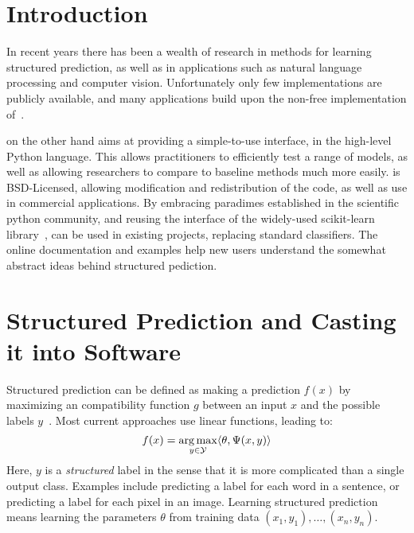 \section{Introduction}
In recent years there has been a wealth of research in methods for learning structured prediction,
as well as in applications such as natural language processing and computer vision.
Unfortunately only few implementations are publicly available, and many applications build upon
the non-free implementation of~\citet{joachims2009cutting}.

\pystruct on the other hand aims at providing a simple-to-use interface, in the high-level Python language.
This allows practitioners to efficiently test a range of models, as well as allowing researchers
to compare to baseline methods much more easily.
\pystruct is BSD-Licensed, allowing modification and redistribution of the code,
as well as use in commercial applications.  By embracing paradimes established
in the scientific python community, and reusing the interface of the
widely-used {\sc scikit-learn} library~\citep{pedregosa2011scikit}, \pystruct
can be used in existing projects, replacing standard classifiers.
The online documentation and examples help new
users understand the somewhat abstract ideas behind structured pediction.



\section{Structured Prediction and Casting it into Software}\label{sec:api}

Structured prediction can be defined as making a prediction $f(x)$ by maximizing an
compatibility function $g$ between an input $x$ and the possible labels
$y$~\cite{nowozin2011structured}. Most current approaches use linear functions,
leading to:
\begin{equation}\label{eq:main_equation}
    f(x) = \operatorname*{arg\,max}_{y \in \mathcal{Y}} \langle \theta, \Psi(x, y) \rangle 
\end{equation}
Here, $y$ is a \emph{structured} label in the sense that it is more complicated than a single
output class. Examples include predicting a label for each word in a sentence, or predicting
a label for each pixel in an image.
Learning structured prediction means learning the parameters $\theta$ from training data
$(x_1, y_1), \dotsc, (x_n, y_n)$.

